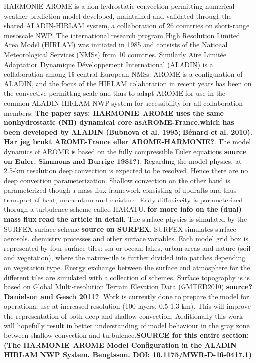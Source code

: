 HARMONIE-AROME is a non-hydrostatic convection-permitting numerical weather prediction model developed, maintained and validated through the shared ALADIN-HIRLAM system, a collaboration of 26 countries on short-range mesoscale NWP. The international research program High Resolution Limited Area Model (HIRLAM) was initiated in 1985 and consists of the National Meteorological Services (NMSs) from 10 countries. Similarly Aire Limitée Adaptation Dynamique Développement International (ALADIN) is a collaboration among 16 central-European NMSs. AROME is a configuration of ALADIN, and the focus of the HIRLAM colaboration in recent years has been on the convective-permitting scale and thus to adapt AROME for use in the common ALADIN-HIRLAM NWP system for accessibility for all collaboration members. \textbf{The paper says: HARMONIE–AROME uses the same nonhydrostatic (NH) dynamical core asAROME-France,which has been developed by ALADIN (Bubnova et al. 1995; Bénard et al. 2010). Har jeg brukt AROME-France eller AROME-HARMONIE?}. The model dynamics of AROME is based on the fully compressible Euler equations \textbf{source on Euler. Simmons and Burrige 1981?)}. Regarding the model physics, at 2.5-km resolution deep convection is expected to be resolved. Hence there are no deep convection parameterization. Shallow convection on the other hand is parameterized though a mass-flux framework consisting of updrafts and thus transport of heat, momentum and moisture. Eddy diffusiveity is parameterized thorugh a turbulence scheme called HARATU. \textbf{for more info on the (dual) mass flux read the article in detail}. The surface physics is simulated by the SURFEX surface scheme \textbf{source on SURFEX}. SURFEX simulates surface aerosols, chemistry processes and other surface variables. Each model grid box is represented by four surface tiles: sea or ocean, lakes, urban areas and nature (soil and vegetation), where the nature-tile is further divided into patches depending on vegetation type. Energy exchange between the surface and atmosphere for the different tiles are simulated with a collection of schemes. Surface topography is is based on Global Multi-resolution Terrain Elevation Data (GMTED2010) \textbf{source? Danielson and Gesch 2011?}. Work is currently done to prepare the model for operational use at increased resolution (100 layers, 0.5-1.3 km). This will improve the representation of both deep and shallow convection. Additionally this work will hopefully result in better understanding of model behaviour in the gray zone between shallow convection and turbulence.\textbf{SOURCE for this entire section: 
(The HARMONIE–AROME Model Configuration in the ALADIN–HIRLAM
NWP System. Bengtsson. DOI: 10.1175/MWR-D-16-0417.1)}
